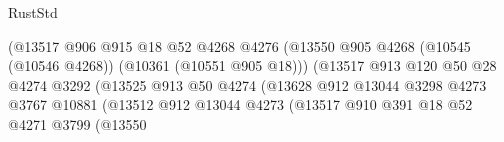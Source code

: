 \begin{lexlean}{RustStd}
\begin{coremodule}
                                                  (@13517
                                                    @906
                                                    @915
                                                    @18
                                                    @52
                                                    @4268
                                                    @4276
                                                    (@13550
                                                      @905
                                                      @4268
                                                      (@10545 (@10546 @4268))
                                                      (@10361 (@10551 @905 @18)))
                                                    (@13517
                                                      @913
                                                      @120
                                                      @50
                                                      @28
                                                      @4274
                                                      @3292
                                                      (@13525
                                                        @913
                                                        @50
                                                        @4274
                                                        (@13628
                                                          @912
                                                          @13044
                                                          @3298
                                                          @4273
                                                          @3767
                                                          @10881
                                                          (@13512
                                                            @912
                                                            @13044
                                                            @4273
                                                            (@13517
                                                              @910
                                                              @391
                                                              @18
                                                              @52
                                                              @4271
                                                              @3799
                                                              (@13550

\end{coremodule}
\end{lexlean}
